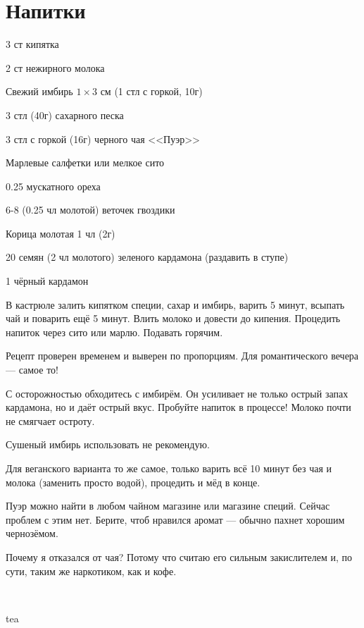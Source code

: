 \chapter*{Напитки}
\label{sec:drinks}


{
\item 3 ст кипятка
\item 2 ст нежирного молока
\item Свежий имбирь $1\times 3$ см (1 стл с горкой, 10г)
\item 3 стл (40г) сахарного песка
\item 3 стл с горкой (16г) черного чая <<Пуэр>>
\item Марлевые салфетки или мелкое сито
}{
\item 0.25 мускатного ореха
\item 6-8 (0.25 чл молотой) веточек гвоздики 
\item Корица молотая 1 чл (2г)
\item 20 семян (2 чл молотого) зеленого кардамона  (раздавить в ступе)  
\item 1 чёрный кардамон 
}{
В кастрюле залить кипятком специи, сахар и имбирь, варить 5 минут, всыпать чай и поварить ещё 5 минут. Влить молоко и довести до кипения. Процедить напиток через сито или марлю. Подавать горячим.
}{
\begin{advice}
\item Рецепт проверен временем и выверен по пропорциям. Для романтического вечера — самое то!
\item С осторожностью обходитесь с имбирём. Он усиливает не только острый запах кардамона, но и даёт острый вкус. Пробуйте напиток в процессе! Молоко почти не смягчает остроту. 
    \item Сушеный имбирь использовать не рекомендую.
    \item Для веганского варианта то же самое, только варить всё 10 минут без чая и молока (заменить просто водой), процедить и мёд в конце.
            \item Пуэр можно найти в любом чайном магазине или магазине специй. Сейчас проблем с этим нет. Берите, чтоб нравился аромат — обычно пахнет хорошим чернозёмом.
                \item Почему я отказался от чая? Потому что считаю его сильным закислителем и, по сути, таким же наркотиком, как и кофе.
\end{advice}
\newpage
~
}{tea}





